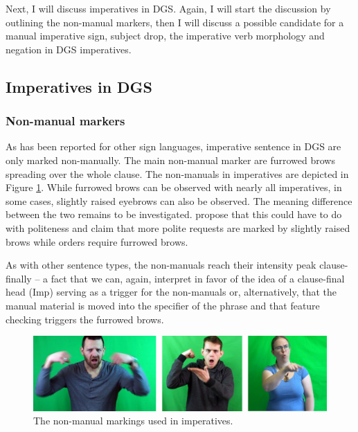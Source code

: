Next, I will discuss imperatives in DGS. Again, I will start the discussion by outlining the non-manual markers, then I will discuss a possible candidate for a manual imperative sign, subject drop, the imperative verb morphology and negation in DGS imperatives. 

\subsection{Imperatives in DGS}\label{imperativesindgs}

\subsubsection{Non-manual markers}
As has been reported for other sign languages, imperative sentence in DGS are only marked non-manually. The main non-manual marker are furrowed brows spreading over the whole clause. The non-manuals in imperatives are depicted in Figure \ref{fig:imperativefacial}. While furrowed brows can be observed with nearly all imperatives, in some cases, slightly raised eyebrows can also be observed. The meaning difference between the two remains to be investigated. \citet[342]{happ2014vork} propose that this could have to do with politeness and claim that more polite requests are marked by slightly raised brows while orders require furrowed brows. 

As with other sentence types, the non-manuals reach their intensity peak clause-finally -- a fact that we can, again, interpret in favor of the idea of a clause-final head (Imp\textdegree ) serving as a trigger for the non-manuals or, alternatively, that the manual material is moved into the specifier of the phrase and that feature checking triggers the furrowed brows.

\begin{figure}[bt]
\centering
	\includegraphics[width=1.0\textwidth]{imperativefacialexpression.jpg}
	\caption{The non-manual markings used in imperatives.}
	\label{fig:imperativefacial}
\end{figure} 

